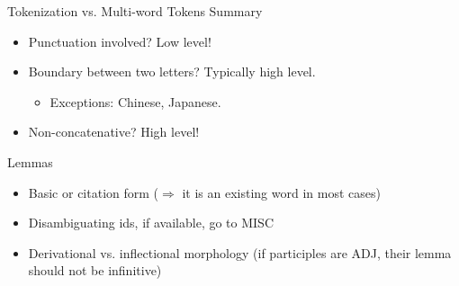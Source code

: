 \documentclass[10pt, compress, aspectratio=169]{beamer}
\newif\ifExtraSlides
\begin{document}
\begin{frame}{Tokenization vs. Multi-word Tokens Summary}
\begin{itemize}
\item<1-> Punctuation involved? Low level!
  \ifExtraSlides
  {
  \begin{itemize}
  \item Exceptions: Spanish-Catalan parallelism.
  \end{itemize}
  }
  \fi
\bigskip
\item<2-> Boundary between two letters? Typically high level.
  \begin{itemize}
  \item Exceptions: Chinese, Japanese.
  \end{itemize}
\bigskip
\item<3-> Non-concatenative? High level!
\end{itemize}
\end{frame}



\begin{frame}{Lemmas}
\begin{itemize}
\item Basic or citation form ($\Rightarrow$ it is an existing word in most cases)
\bigskip
\item Disambiguating ids, if available, go to MISC
\bigskip
\item Derivational vs. inflectional morphology (if participles are ADJ, their lemma should not be infinitive)
\end{itemize}
\end{frame}
\end{document}
